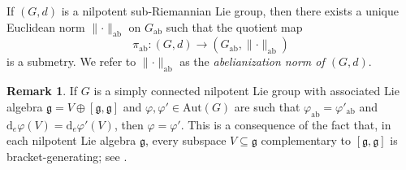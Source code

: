\documentclass[a4paper,11pt,reqno]{amsart}
\theoremstyle{plain}
\newtheorem{lemma}[theorem]{Lemma}
\theoremstyle{definition}
\newtheorem{remark}[theorem]{Remark}
\newcommand{\g}{\mathfrak{g}}
\newcommand{\vphi}{\varphi}
\newcommand{\id}{e}
\newcommand{\de}{\mathrm{d}}
\begin{document}
If $(G,d)$ is a nilpotent sub-Riemannian Lie group, then there exists a unique Euclidean norm $\lVert \cdot \rVert_\mathrm{ab}$ on $G_\mathrm{ab}$ such that the quotient map
 \begin{equation*}
 \pi_\mathrm{ab} \colon (G,d) \to (G_\mathrm{ab}, \lVert \cdot \rVert_\mathrm{ab})
 \end{equation*}
 is a submetry. We refer to $\lVert \cdot \rVert_\mathrm{ab}$ as the \emph{abelianization norm of $(G,d)$}. 
 
\begin{remark} \label{equality automorphism}
 If $G$ is a simply connected nilpotent Lie group with associated Lie algebra $\g = V \oplus [\g,\g]$ and $\vphi,\vphi' \in \mathrm{Aut}(G)$ are such that $\vphi_\mathrm{ab} = \vphi'_\mathrm{ab}$ and $\de_\id \vphi(V) = \de_\id \vphi'(V)$, then $\vphi = \vphi'$. This is a consequence of the fact that, in each nilpotent Lie algebra $\g$, every subspace $V \subseteq \g$ complementary to $[\g,\g]$ is bracket-generating; see \cite[Exercise~10.5.8]{donne2024metricliegroupscarnotcaratheodory}.
\end{remark} 

\end{document}
